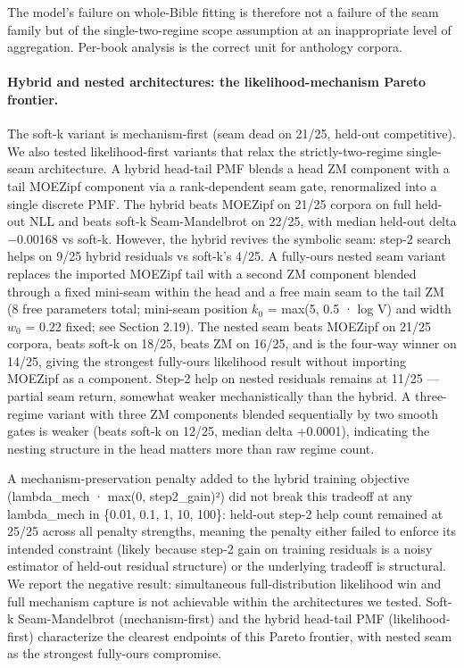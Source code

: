\documentclass[11pt]{article}
\begin{document}


The model's failure on whole-Bible fitting is therefore not a failure of the seam family but of the single-two-regime scope assumption at an inappropriate level of aggregation. Per-book analysis is the correct unit for anthology corpora.

\paragraph{Hybrid and nested architectures: the likelihood-mechanism Pareto frontier.} The soft-k variant is mechanism-first (seam dead on 21/25, held-out competitive). We also tested likelihood-first variants that relax the strictly-two-regime single-seam architecture. A hybrid head-tail PMF blends a head ZM component with a tail MOEZipf component via a rank-dependent seam gate, renormalized into a single discrete PMF. The hybrid beats MOEZipf on 21/25 corpora on full held-out NLL and beats soft-k Seam-Mandelbrot on 22/25, with median held-out delta −0.00168 vs soft-k. However, the hybrid revives the symbolic seam: step-2 search helps on 9/25 hybrid residuals vs soft-k's 4/25. A fully-ours nested seam variant replaces the imported MOEZipf tail with a second ZM component blended through a fixed mini-seam within the head and a free main seam to the tail ZM (8 free parameters total; mini-seam position $k_0$ = max(5, 0.5 · log V) and width $w_0$ = 0.22 fixed; see Section 2.19). The nested seam beats MOEZipf on 21/25 corpora, beats soft-k on 18/25, beats ZM on 16/25, and is the four-way winner on 14/25, giving the strongest fully-ours likelihood result without importing MOEZipf as a component. Step-2 help on nested residuals remains at 11/25 — partial seam return, somewhat weaker mechanistically than the hybrid. A three-regime variant with three ZM components blended sequentially by two smooth gates is weaker (beats soft-k on 12/25, median delta +0.0001), indicating the nesting structure in the head matters more than raw regime count.

A mechanism-preservation penalty added to the hybrid training objective (lambda\_mech · max(0, step2\_gain)²) did not break this tradeoff at any lambda\_mech in \{0.01, 0.1, 1, 10, 100\}: held-out step-2 help count remained at 25/25 across all penalty strengths, meaning the penalty either failed to enforce its intended constraint (likely because step-2 gain on training residuals is a noisy estimator of held-out residual structure) or the underlying tradeoff is structural. We report the negative result: simultaneous full-distribution likelihood win and full mechanism capture is not achievable within the architectures we tested. Soft-k Seam-Mandelbrot (mechanism-first) and the hybrid head-tail PMF (likelihood-first) characterize the clearest endpoints of this Pareto frontier, with nested seam as the strongest fully-ours compromise.
\end{document}
